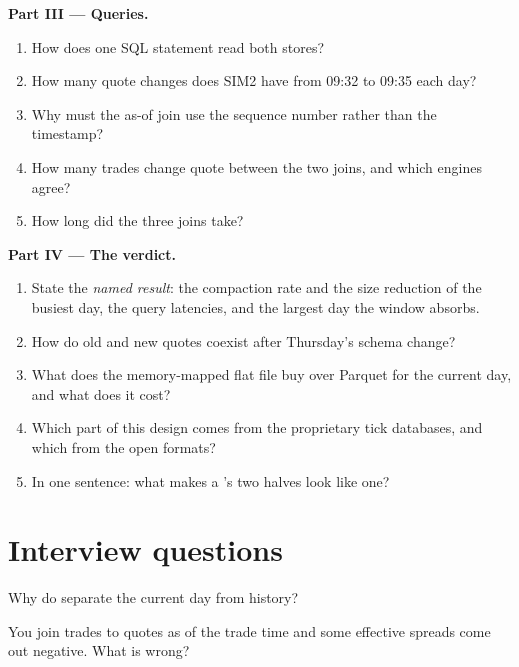 \begin{problem}
\medskip\noindent\textbf{Part III --- Queries.}
\begin{enumerate}[resume]
\item How does one SQL statement read both stores?
\item How many quote changes does SIM2 have from 09:32 to 09:35 each day?
\item Why must the as-of join use the sequence number rather than the timestamp?
\item How many trades change quote between the two joins, and which engines agree?
\item How long did the three joins take?
\end{enumerate}

\medskip\noindent\textbf{Part IV --- The verdict.}
\begin{enumerate}[resume]
\item State the \emph{named result}: the compaction rate and the size reduction of the busiest day, the query latencies, and the
largest day the window absorbs.
\item How do old and new quotes coexist after Thursday's schema change?
\item What does the memory-mapped flat file buy over Parquet for the current day, and what does it cost?
\item Which part of this design comes from the proprietary tick databases, and which from the open formats?
\item In one sentence: what makes a 's two halves look like one?
\end{enumerate}
\end{problem}

\section{Interview questions}

\begin{interviewq}\label{iq:pl:a-tick-store-on-open-formats:1}
Why do  separate the current day from history?
\end{interviewq}

\begin{interviewq}\label{iq:pl:a-tick-store-on-open-formats:2}
You join trades to quotes as of the trade time and some effective spreads come out negative. What is wrong?
\end{interviewq}

